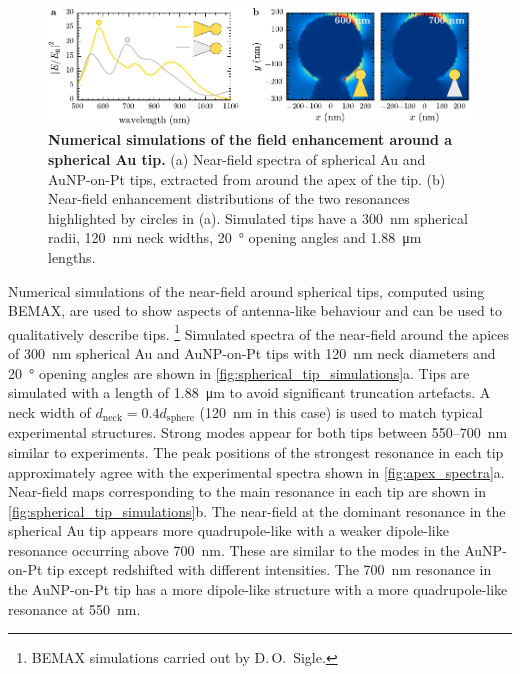 \documentclass{article}
\begin{document}
\begin{figure}[bt]
\centering
\includegraphics{figures/spherical_tip_simulations}
\caption[Numerical simulations of the field enhancement around a spherical Au tip]{\textbf{Numerical simulations of the field enhancement around a spherical Au tip.} (a) Near-field spectra of spherical Au and AuNP-on-Pt tips, extracted from around the apex of the tip. (b) Near-field enhancement distributions of the two resonances highlighted by circles in (a). Simulated tips have a \SI{300}{nm} spherical radii, \SI{120}{nm} neck widths, \SI{20}{\degree} opening angles and \SI{1.88}{\micro\metre} lengths.}
\label{fig:spherical_tip_simulations}
\end{figure}

Numerical simulations of the near-field around spherical tips, computed using BEMAX, are used to show aspects of antenna-like behaviour and can be used to qualitatively describe tips.%
\footnote{BEMAX simulations carried out by D.\,O.\ Sigle.}
Simulated spectra of the near-field around the apices of \SI{300}{nm} spherical Au and AuNP-on-Pt tips with \SI{120}{nm} neck diameters and \SI{20}{\degree} opening angles are shown in \autoref{fig:spherical_tip_simulations}a. Tips are simulated with a length of \SI{1.88}{\micro\metre} to avoid significant truncation artefacts. A neck width of $d_{\mathrm{neck}}=0.4d_{\mathrm{sphere}}$ (\SI{120}{nm} in this case) is used to match typical experimental structures. Strong modes appear for both tips between 550--\SI{700}{nm} similar to experiments. The peak positions of the strongest resonance in each tip approximately agree with the experimental spectra shown in \autoref{fig:apex_spectra}a. Near-field maps corresponding to the main resonance in each tip are shown in \autoref{fig:spherical_tip_simulations}b. The near-field at the dominant resonance in the spherical Au tip appears more quadrupole-like with a weaker dipole-like resonance occurring above \SI{700}{nm}. These are similar to the modes in the AuNP-on-Pt tip except redshifted with different intensities. The \SI{700}{nm} resonance in the AuNP-on-Pt tip has a more dipole-like structure with a more quadrupole-like resonance at \SI{550}{nm}.
\end{document}
